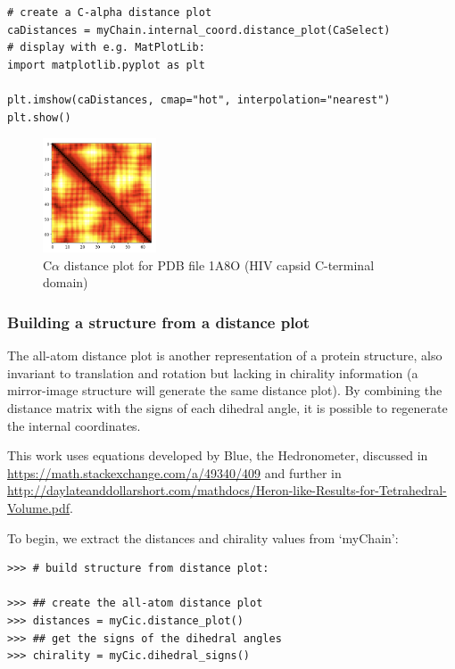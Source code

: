 \begin{verbatim}
# create a C-alpha distance plot
caDistances = myChain.internal_coord.distance_plot(CaSelect)
# display with e.g. MatPlotLib:
import matplotlib.pyplot as plt

plt.imshow(caDistances, cmap="hot", interpolation="nearest")
plt.show()
\end{verbatim}

\begin{figure}[h!]
\begin{htmlonly}
\end{htmlonly}
\begin{latexonly}
\includegraphics[width=0.3\textwidth]{images/1a8o-ca-plot.png}
\end{latexonly}
\caption{C$\alpha$ distance plot for PDB file 1A8O (HIV capsid C-terminal domain)}
\label{fig:distanceplot}
\end{figure}

\subsubsection{Building a structure from a distance plot}

The all-atom distance plot is another representation of a protein structure, also
invariant to translation and rotation but lacking in chirality information (a
mirror-image structure will generate the same distance plot).  By combining the
distance matrix with the signs of each dihedral angle, it is possible to regenerate
the internal coordinates.  

This work uses equations developed by Blue, the Hedronometer,
discussed in \url{https://math.stackexchange.com/a/49340/409} and further in 
\url{http://daylateanddollarshort.com/mathdocs/Heron-like-Results-for-Tetrahedral-Volume.pdf}.

To begin, we extract the distances and chirality values from `myChain':

\begin{verbatim}
>>> # build structure from distance plot:

>>> ## create the all-atom distance plot
>>> distances = myCic.distance_plot()
>>> ## get the signs of the dihedral angles
>>> chirality = myCic.dihedral_signs()
\end{verbatim}

